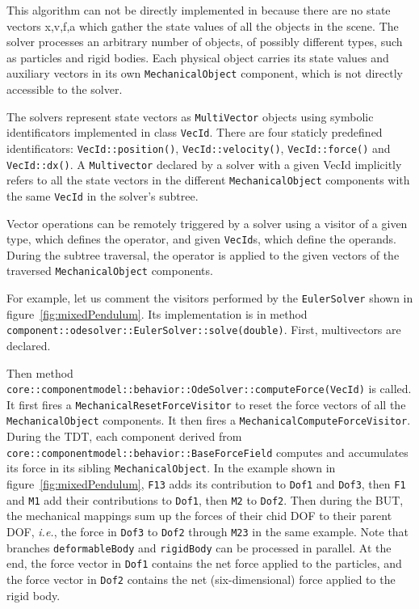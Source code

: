 This algorithm can not be directly implemented in \sofa because there are no state vectors x,v,f,a which gather the state values of all the objects in the scene.
The solver processes an arbitrary number of objects, of possibly different types, such as particles and rigid bodies. Each physical object carries its state values and auxiliary vectors in its own \texttt{MechanicalObject} component, which is not directly accessible to the solver.

The solvers represent state vectors as \texttt{MultiVector} objects using symbolic identificators implemented in class \texttt{VecId}.
There are four staticly predefined identificators: \texttt{VecId::position()}, \texttt{VecId::velocity()}, \texttt{VecId::force()} and \texttt{VecId::dx()}.
A \texttt{Multivector} declared by a solver with a given VecId implicitly refers to all the state vectors in the different \texttt{MechanicalObject} components with the same \texttt{VecId} in the solver's subtree.

Vector operations can be remotely triggered by a solver using a visitor of a given type, which defines the operator, and given \texttt{VecId}s, which define the operands.
During the subtree traversal, the operator is applied to the given vectors of the traversed \texttt{MechanicalObject} components.

For example, let us comment the visitors performed by the \texttt{EulerSolver} shown in figure~\ref{fig:mixedPendulum}. Its implementation is in method \texttt{component::odesolver::EulerSolver::solve(double)}.
First, multivectors are declared.

Then method \texttt{core::componentmodel::behavior::OdeSolver::computeForce(VecId)} is called. 
It first fires a \texttt{MechanicalResetForceVisitor} to reset the force vectors of all the \texttt{MechanicalObject} components. 
It then fires a  \texttt{MechanicalComputeForceVisitor}. 
During the TDT, each component derived from \texttt{core::componentmodel::behavior::BaseForceField} computes and accumulates its force in its sibling \texttt{MechanicalObject}. 
In the example shown in figure~\ref{fig:mixedPendulum}, \texttt{F13} adds its contribution to \texttt{Dof1} and \texttt{Dof3}, then \texttt{F1} and \texttt{M1} add their contributions to \texttt{Dof1}, then \texttt{M2} to \texttt{Dof2}. 
Then during the BUT, the mechanical mappings sum up the forces of their chid DOF to their parent DOF, \textit{i.e.}, the force in \texttt{Dof3} to \texttt{Dof2} through \texttt{M23} in the same example.
Note that branches \texttt{deformableBody} and \texttt{rigidBody} can be processed in parallel.
At the end, the force vector in \texttt{Dof1} contains the net force applied to the particles, and the force vector in \texttt{Dof2} contains the net (six-dimensional) force applied to the rigid body.

